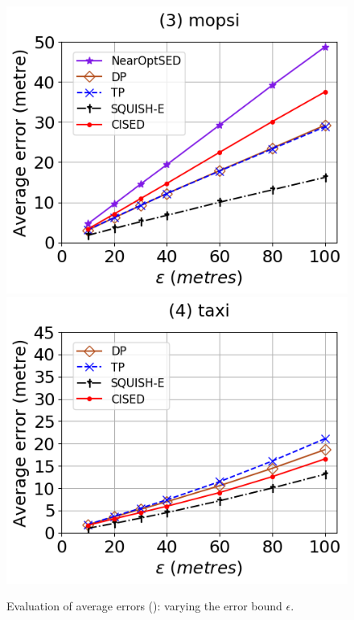 \begin{figure}[tb!]
	\includegraphics[scale=0.315]{Figures/Exp-SED-error-epsilon-mopsi.png}		\hspace{1ex}
	\includegraphics[scale=0.315]{Figures/Exp-SED-error-epsilon-taxi.png}
	\vspace{-2.5ex}
	\caption{\small Evaluation of average errors (\sed): varying the error bound $\epsilon$.}
	\label{fig:ae-sed}
	\vspace{-3ex}
\end{figure}

\vspace{-1ex}
